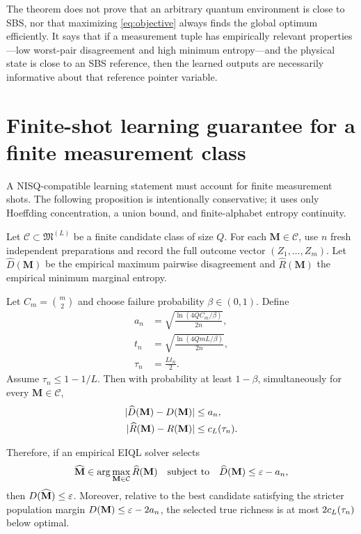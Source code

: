 \begin{remark}
The theorem does not prove that an arbitrary quantum environment is close to SBS, nor that maximizing \cref{eq:objective} always finds the global optimum efficiently. It says that if a measurement tuple has empirically relevant properties---low worst-pair disagreement and high minimum entropy---and the physical state is close to an SBS reference, then the learned outputs are necessarily informative about that reference pointer variable.
\end{remark}

\section{Finite-shot learning guarantee for a finite measurement class}

A NISQ-compatible learning statement must account for finite measurement shots. The following proposition is intentionally conservative; it uses only Hoeffding concentration, a union bound, and finite-alphabet entropy continuity.

Let $\mathcal C\subset\mathfrak M^{(L)}$ be a finite candidate class of size $Q$. For each $\mathbf M\in\mathcal C$, use $n$ fresh independent preparations and record the full outcome vector $(Z_1,\ldots,Z_m)$. Let $\widehat D(\mathbf M)$ be the empirical maximum pairwise disagreement and $\widehat R(\mathbf M)$ the empirical minimum marginal entropy.

\begin{proposition}
\label{prop:finite}
Let $C_m=\binom{m}{2}$ and choose failure probability $\beta\in(0,1)$. Define
\begin{align}
a_n&=\sqrt{\frac{\ln(4QC_m/\beta)}{2n}},\\
t_n&=\sqrt{\frac{\ln(4QmL/\beta)}{2n}},\\
\tau_n&=\frac{L t_n}{2}.
\end{align}
Assume $\tau_n\le1-1/L$. Then with probability at least $1-\beta$, simultaneously for every $\mathbf M\in\mathcal C$,
\begin{align}
|\widehat D(\mathbf M)-D(\mathbf M)|&\le a_n,\label{eq:Duniform}\\
|\widehat R(\mathbf M)-R(\mathbf M)|&\le c_L(\tau_n).\label{eq:Runiform}
\end{align}

Therefore, if an empirical EIQL solver selects
\begin{equation}
\widehat{\mathbf M}\in\arg\max_{\mathbf M\in\mathcal C}\widehat R(\mathbf M)
\quad\text{subject to}\quad
\widehat D(\mathbf M)\le\varepsilon-a_n,
\label{eq:empsolver}
\end{equation}
then $D(\widehat{\mathbf M})\le\varepsilon$. Moreover, relative to the best candidate satisfying the stricter population margin $D(\mathbf M)\le\varepsilon-2a_n$, the selected true richness is at most $2c_L(\tau_n)$ below optimal.
\end{proposition}

